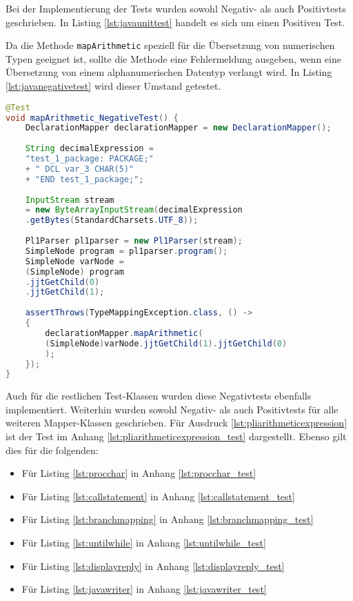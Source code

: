 Bei der Implementierung der Tests wurden sowohl Negativ- als auch Positivtests geschrieben.
In Listing \ref{lst:javaunittest} handelt es sich um einen Positiven Test. 

Da die Methode \verb+mapArithmetic+ speziell für die Übersetzung von numerischen Typen geeignet ist, sollte die Methode eine Fehlermeldung ausgeben, wenn eine Übersetzung von einem alphanumerischen Datentyp verlangt wird.  In Listing \ref{lst:javanegativetest} wird dieser Umstand getestet. 

\begin{lstlisting}[language=Java, caption=Arithmetic Node Unit-test, label={lst:javanegativetest}]
@Test
void mapArithmetic_NegativeTest() {
	DeclarationMapper declarationMapper = new DeclarationMapper();
	
	String decimalExpression = 
	"test_1_package: PACKAGE;" 
	+ "	DCL var_3 CHAR(5)" 
	+ "END test_1_package;";
	
	InputStream stream
	= new ByteArrayInputStream(decimalExpression
	.getBytes(StandardCharsets.UTF_8));
		
	Pl1Parser pl1parser = new Pl1Parser(stream);
	SimpleNode program = pl1parser.program();
	SimpleNode varNode = 
	(SimpleNode) program
	.jjtGetChild(0)
	.jjtGetChild(1);
		
	assertThrows(TypeMappingException.class, () -> 
	{
		declarationMapper.mapArithmetic(
		(SimpleNode)varNode.jjtGetChild(1).jjtGetChild(0)
		);
	});
}
\end{lstlisting}

Auch für die restlichen Test-Klassen wurden diese Negativtests ebenfalls implementiert. 
Weiterhin wurden sowohl Negativ- als auch Positivtests für alle weiteren Mapper-Klassen geschrieben. Für Ausdruck \ref{lst:pliarithmeticexpression} ist der Test im Anhang \ref{lst:pliarithmeticexpression_test} dargestellt. Ebenso gilt dies für die folgenden:

\begin{itemize}
	\item Für Listing \ref{lst:procchar} in Anhang \ref{lst:procchar_test}
	\item Für Listing \ref{lst:callstatement} in Anhang \ref{lst:callstatement_test}
	\item Für Listing \ref{lst:branchmapping} in Anhang \ref{lst:branchmapping_test}
	\item Für Listing \ref{lst:untilwhile} in Anhang \ref{lst:untilwhile_test}
	\item Für Listing \ref{lst:displayreply} in Anhang \ref{lst:displayreply_test}
	\item Für Listing \ref{lst:javawriter} in Anhang \ref{lst:javawriter_test}
\end{itemize}

